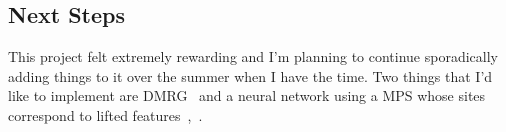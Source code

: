 \documentclass[12pt]{article}
\begin{document}
\begin{multicols}{2}
	\subsection*{Next Steps}
	This project felt extremely rewarding and I'm planning to continue
	sporadically adding things to it over the summer when I have the
	time. Two things that I'd like to implement are DMRG~\cite{DMRG}
	and a neural network using a MPS whose sites correspond to lifted
	features~\cite{mps-ml},~\cite{Huggins}.




\end{multicols}
\end{document}
